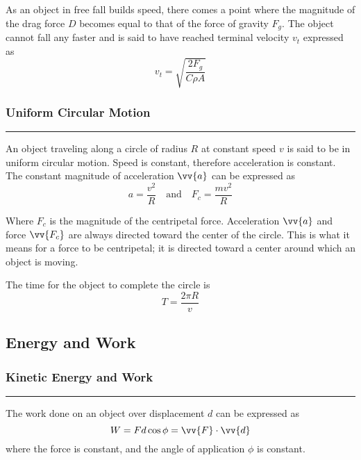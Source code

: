 \documentclass{article}
\begin{document}
    \smallskip\noindent
    As an object in free fall builds speed, there comes a point where the magnitude of the drag force ${D}$ becomes equal to that of the force of gravity $F_g$.
    The object cannot fall any faster and is said to have reached terminal velocity $v_t$ expressed as
    \[
        v_t = \sqrt{\frac{2F_g}{C\rho A}}
    \]

    \smallskip
    \subsubsection*{Uniform Circular Motion}
    \vspace{-1em}
    \rule{\linewidth}{.1mm}

    \smallskip\noindent
    An object traveling along a circle of radius $R$ at constant speed $v$ is said to be in uniform circular motion.
    Speed is constant, therefore acceleration is constant.
    The constant magnitude of acceleration $\vv{a}$ can be expressed as
    \[
        a=\frac{v^2}{R} \quad \text{and} \quad F_c=\frac{mv^2}{R}
    \]

    \smallskip\noindent
    Where $F_c$ is the magnitude of the centripetal force.
    Acceleration $\vv{a}$ and force $\vv{F_c}$ are always directed toward the center of the circle.
    This is what it means for a force to be centripetal; it is directed toward a center around which an object is moving.

    \medskip\noindent
    The time for the object to complete the circle is
    \[
        T = \frac{2\pi R}{v}
    \]

    \pagebreak
    \begin{center}
        \subsection*{Energy and Work}
    \end{center}

    \smallskip
    \subsubsection*{Kinetic Energy and Work}
    \vspace{-1em}
    \rule{\linewidth}{.1mm}

    \smallskip\noindent
    The work done on an object over displacement $d$ can be expressed as
    \[
        W=Fd\cos\phi=\vv{F}\cdot\vv{d}
    \]
    \noindent
    where the force is constant, and the angle of application $\phi$ is constant.
\end{document}

